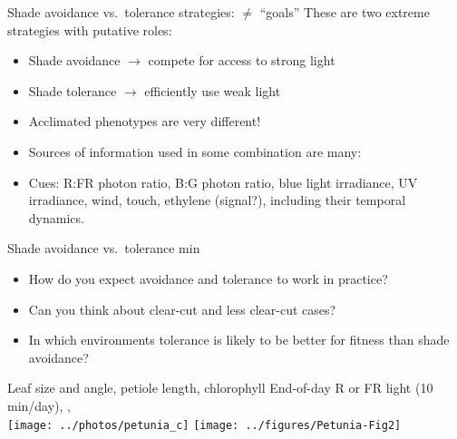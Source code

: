 \documentclass[10pt]{beamer}
\begin{document}
\begin{frame}{Shade avoidance vs.\ tolerance strategies: $\neq$ ``goals''}
These are two extreme strategies with putative roles:
  \begin{itemize}
    \item Shade avoidance $\to$ compete for access to strong light
    \item Shade tolerance $\to$ efficiently use weak light
    \item Acclimated phenotypes are very different!
    \item Sources of information used in some combination are many:
    \item Cues: R:FR photon ratio, B:G photon ratio, blue light irradiance, UV irradiance, wind, touch, ethylene (signal?), including their temporal dynamics.
  \end{itemize}
\end{frame}

\begin{frame}{Shade avoidance vs.\ tolerance  min}
  \begin{itemize}
  \item How do you expect avoidance and tolerance to work in practice?
  \item Can you think about clear-cut and less clear-cut cases?
  \item In which environments tolerance is likely to be better for fitness than shade avoidance?
  \end{itemize}
\end{frame}

\begin{frame}{Leaf size and angle, petiole length, chlorophyll}{}
    {\footnotesize End-of-day R or FR light (10 min/day),     , \autocite{Casal1987}\\}
    \texttt{[image: ../photos/petunia\_c]}\hfil%
    \texttt{[image: ../figures/Petunia-Fig2]}
\end{frame}
\end{document}

